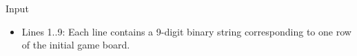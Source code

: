 Input
\begin{itemize}
	\item      Lines 1..9: Each line contains a 9-digit binary string corresponding         to one row of the initial game board.    
\end{itemize}